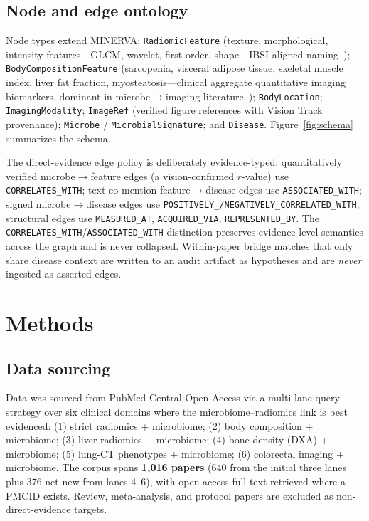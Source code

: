 \documentclass[10pt,twocolumn,letterpaper]{article}
\begin{document}
\subsection{Node and edge ontology}

Node types extend MINERVA: \texttt{RadiomicFeature} (texture, morphological,
intensity features---GLCM, wavelet, first-order, shape---IBSI-aligned
naming~\cite{zwanenburg2020ibsi,vanGriethuysen2017pyradiomics});
\texttt{BodyCompositionFeature} (sarcopenia, visceral adipose tissue,
skeletal muscle index, liver fat fraction, myosteatosis---clinical aggregate
quantitative imaging biomarkers, dominant in microbe$\rightarrow$imaging
literature~\cite{ticinesi2019gutmuscle,cruzjentoft2019ewgsop2});
\texttt{BodyLocation}; \texttt{ImagingModality}; \texttt{ImageRef} (verified
figure references with Vision Track provenance); \texttt{Microbe} /
\texttt{MicrobialSignature}; and \texttt{Disease}.
Figure~\ref{fig:schema} summarizes the schema.

The direct-evidence edge policy is deliberately evidence-typed:
quantitatively verified microbe$\rightarrow$feature edges (a vision-confirmed
$r$-value) use \texttt{CORRELATES\_WITH}; text co-mention
feature$\rightarrow$disease edges use \texttt{ASSOCIATED\_WITH}; signed
microbe$\rightarrow$disease edges use
\texttt{POSITIVELY\_/NEGATIVELY\_CORRELATED\_WITH}; structural edges use
\texttt{MEASURED\_AT}, \texttt{ACQUIRED\_VIA}, \texttt{REPRESENTED\_BY}. The
\texttt{CORRELATES\_WITH}/\texttt{ASSOCIATED\_WITH} distinction preserves
evidence-level semantics across the graph and is never collapsed. Within-paper
bridge matches that only share disease context are written to an audit
artifact as hypotheses and are \emph{never} ingested as asserted edges.

\section{Methods}

\subsection{Data sourcing}

Data was sourced from PubMed Central Open Access via a multi-lane query
strategy over six clinical domains where the microbiome--radiomics link is
best evidenced: (1) strict radiomics + microbiome; (2) body composition +
microbiome; (3) liver radiomics + microbiome; (4) bone-density (DXA) +
microbiome; (5) lung-CT phenotypes + microbiome; (6) colorectal imaging +
microbiome. The corpus spans \textbf{1{,}016 papers} (640 from the initial
three lanes plus 376 net-new from lanes 4--6), with open-access full text
retrieved where a PMCID exists. Review, meta-analysis, and protocol papers
are excluded as non-direct-evidence targets.
\end{document}
